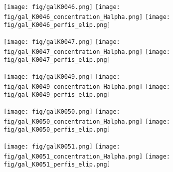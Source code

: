 \begin{figure}[!ht]
\begin{center}
\setcaptionmargin{1cm}
\texttt{[image: fig/galK0046.png]}
\texttt{[image: fig/gal\_K0046\_concentration\_Halpha.png]}
\texttt{[image: fig/gal\_K0046\_perfis\_elip.png]}
\end{center}
\end{figure}


\begin{figure}[!ht]
\begin{center}
\setcaptionmargin{1cm}
\texttt{[image: fig/galK0047.png]}
\texttt{[image: fig/gal\_K0047\_concentration\_Halpha.png]}
\texttt{[image: fig/gal\_K0047\_perfis\_elip.png]}
\end{center}
\end{figure}


\begin{figure}[!ht]
\begin{center}
\setcaptionmargin{1cm}
\texttt{[image: fig/galK0049.png]}
\texttt{[image: fig/gal\_K0049\_concentration\_Halpha.png]}
\texttt{[image: fig/gal\_K0049\_perfis\_elip.png]}
\end{center}
\end{figure}


\begin{figure}[!ht]
\begin{center}
\setcaptionmargin{1cm}
\texttt{[image: fig/galK0050.png]}
\texttt{[image: fig/gal\_K0050\_concentration\_Halpha.png]}
\texttt{[image: fig/gal\_K0050\_perfis\_elip.png]}
\end{center}
\end{figure}


\begin{figure}[!ht]
\begin{center}
\setcaptionmargin{1cm}
\texttt{[image: fig/galK0051.png]}
\texttt{[image: fig/gal\_K0051\_concentration\_Halpha.png]}
\texttt{[image: fig/gal\_K0051\_perfis\_elip.png]}
\end{center}
\end{figure}


